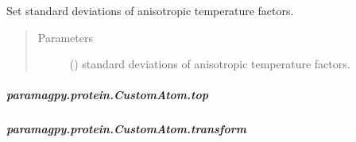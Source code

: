 \documentclass[a4paper,10pt,english,openany,oneside]{sphinxmanual}
\begin{document}
\begin{fulllineitems}
\begin{fulllineitems}
\begin{fulllineitems}
\label{\detokenize{reference/generated/paramagpy.protein.CustomAtom.set_siguij:paramagpy.protein.CustomAtom.set_siguij}}
\sphinxAtStartPar
Set standard deviations of anisotropic temperature factors.
\begin{quote}\begin{description}
\item[{Parameters}] \leavevmode
\sphinxAtStartPar
{} (\sphinxstyleliteralemphasis{\sphinxupquote{ (}}\sphinxstyleliteralemphasis{\sphinxupquote{)}}) \textendash{} standard deviations of anisotropic temperature factors.

\end{description}\end{quote}

\end{fulllineitems}



\subparagraph{paramagpy.protein.CustomAtom.top}
\label{\detokenize{reference/generated/paramagpy.protein.CustomAtom.top:paramagpy-protein-customatom-top}}\label{\detokenize{reference/generated/paramagpy.protein.CustomAtom.top::doc}}

\begin{fulllineitems}
\label{\detokenize{reference/generated/paramagpy.protein.CustomAtom.top:paramagpy.protein.CustomAtom.top}}
\end{fulllineitems}



\subparagraph{paramagpy.protein.CustomAtom.transform}
\label{\detokenize{reference/generated/paramagpy.protein.CustomAtom.transform:paramagpy-protein-customatom-transform}}\label{\detokenize{reference/generated/paramagpy.protein.CustomAtom.transform::doc}}


\end{fulllineitems}
\end{fulllineitems}
\end{document}
